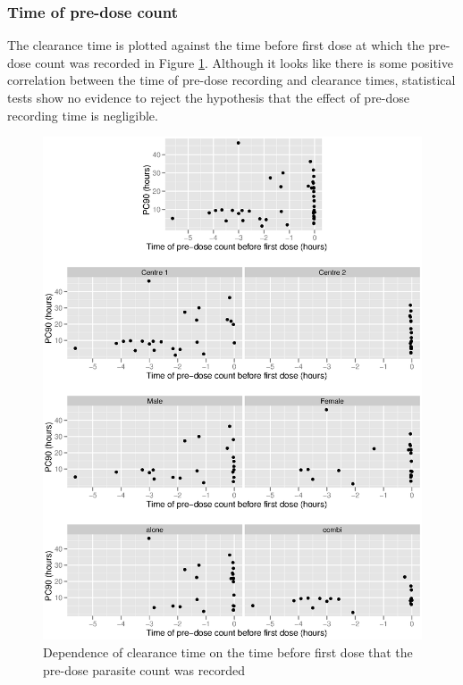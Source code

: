 \subsubsection*{Time of pre-dose count}
The clearance time is plotted against the time before first dose at which the pre-dose count was recorded in Figure \ref{pretime-ancova}. Although it looks like there is some positive correlation between the time of pre-dose recording and clearance times, statistical tests show no evidence to reject the hypothesis that the effect of pre-dose recording time is negligible.
\begin{figure}
\includegraphics[width=150mm]{pretime-ancova.eps} 
\caption{Dependence of clearance time on the time before first dose that the pre-dose parasite count was recorded}
\label{pretime-ancova}
\end{figure}

